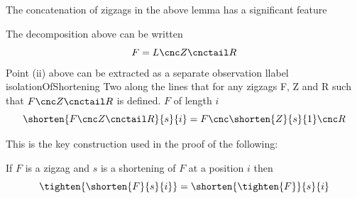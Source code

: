 The concatenation of zigzags in the above lemma has a significant feature

\begin{aside}
The decomposition above can be written
\[
F = L \cnc Z \cnctail R
\]
Point (ii) above can be extracted as a separate observation
llabel {isolationOfShortening Two} along the lines that for any zigzags F, Z and R such that 
$F \cnc Z \cnctail R$ is defined. $F$ of length $i$
\[
\shorten{F \cnc Z \cnctail R}{s}{i}
     = F \cnc \shorten{Z}{s}{1} \cnc R
\] 
\end{aside}

This is the key construction used in the proof of the following:
\begin{lemma}
If $F$ is a zigzag and $s$ is a shortening of $F$ at a position $i$ then
\[
\tighten{\shorten{F}{s}{i}} = \shorten{\tighten{F}}{s}{i}
\]
\end{lemma}
